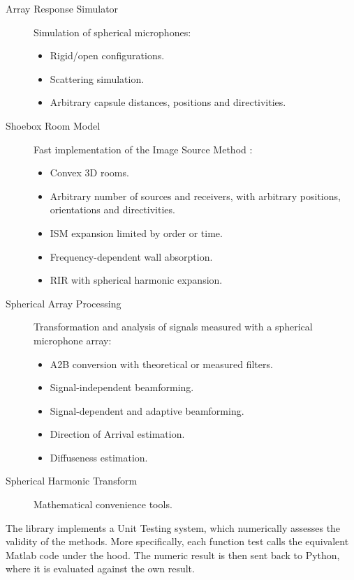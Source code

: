 \begin{description}

	\item [Array Response Simulator] Simulation of
spherical microphones:
	\begin{itemize}
		\item Rigid/open configurations.
		\item Scattering simulation.
		\item Arbitrary capsule distances, positions and directivities.
	\end{itemize}
	
	\item [Shoebox Room Model] Fast implementation of the Image Source Method \cite{imagemethod}:
	\begin{itemize}
		\item Convex 3D rooms.
		\item Arbitrary number of sources and receivers, with arbitrary positions, orientations and directivities.
		\item ISM expansion limited by order or time.
		\item Frequency-dependent wall absorption.
		\item RIR with spherical harmonic expansion.
	\end{itemize}
	
	\item [Spherical Array Processing] Transformation and analysis of signals measured with a spherical microphone array:
	\begin{itemize}
		\item A2B conversion with theoretical or measured filters.
		\item Signal-independent beamforming.
		\item Signal-dependent and adaptive beamforming.
		\item Direction of Arrival estimation.
		\item Diffuseness estimation.
	\end{itemize}
	
	\item [Spherical Harmonic Transform] Mathematical convenience tools.
\end{description}

The library implements a Unit Testing system, which numerically assesses the validity of the methods. 
More specifically, each function test calls the equivalent Matlab code under the hood. The numeric result is then sent back to Python, where
it is evaluated against the own result.

